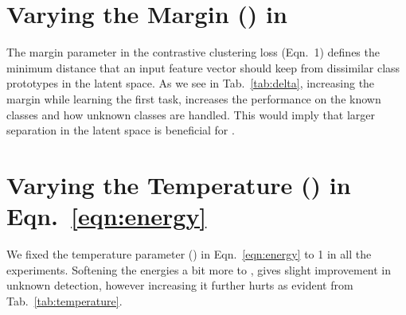 \documentclass[final]{cvpr}
\begin{document}
\section{Varying the Margin () in }
The margin parameter  in the contrastive clustering loss  (Eqn.~1) defines the minimum distance that an input feature vector should keep from dissimilar class prototypes in the latent space. As we see in Tab.~\ref{tab:delta}, increasing the margin while learning the first task, increases the performance on the known classes and how unknown classes are handled. This would imply that larger separation in the latent space is beneficial for \method.

\begin{table}[h]
\centering
{}
\caption{Increasing the margin , improves the performance on known and unknown classes, concurring with our assumption that separation in the latent space is beneficial for \method.}
\label{tab:delta}
\end{table}





\section{Varying the Temperature () in Eqn.~\ref{eqn:energy}}

We fixed the temperature parameter () in Eqn.~\ref{eqn:energy} to 1 in all the experiments. Softening the energies a bit more to , gives slight improvement in unknown detection, however increasing it further hurts as evident from Tab.~\ref{tab:temperature}.
\begin{table}[h]
\centering
{}
\caption{There is a nice ballpark for temperature parameter between  and , which gives the optimal performance.}
\label{tab:temperature}
\end{table}
\end{document}
